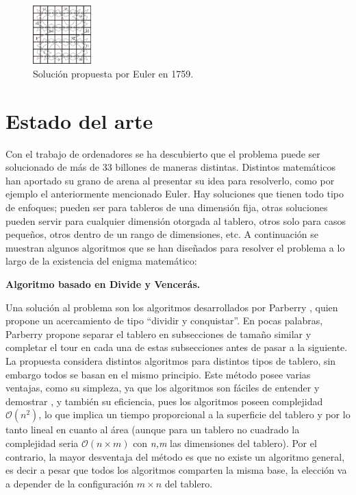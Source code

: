 \documentclass[journal, 10pt]{IEEEtran}
\begin{document}
\begin{figure}[h]

\centering
\includegraphics[width=0.2\textwidth]{figures/EulerKT.png}
\caption{Soluci\'on propuesta por Euler en 1759.}
\label{fig:euler}

\end{figure}


\section{Estado del arte}
Con el trabajo de ordenadores se ha descubierto que el problema puede ser solucionado de más de 33 billones de maneras distintas. Distintos matemáticos han aportado su grano de arena al presentar su idea para resolverlo, como por ejemplo el anteriormente mencionado Euler. Hay soluciones que tienen todo tipo de enfoques; pueden ser para tableros de una dimensión fija, otras soluciones pueden servir para cualquier dimensión otorgada al tablero, otros solo para casos pequeños, otros dentro de un rango de dimensiones, etc. A continuación se muestran algunos algoritmos que se han diseñados para resolver el problema a lo largo de la existencia del enigma matemático:

\textbf{Algoritmo basado en Divide y Vencer\'as.}

Una solución al problema son los algoritmos desarrollados por Parberry \cite{Parberry:1997}, quien propone un acercamiento de tipo “dividir y conquistar”. En pocas palabras, Parberry propone separar el tablero en subsecciones de tamaño similar y completar el tour en cada una de estas subsecciones antes de pasar a la siguiente. La propuesta considera distintos algoritmos para distintos tipos de tablero, sin embargo todos se basan en el mismo principio. Este método posee varias ventajas, como su simpleza, ya que los algoritmos son fáciles de entender y demostrar \cite{Parberry:1997}, y también su eficiencia, pues los algoritmos poseen complejidad $\mathcal{O}(n^2)$, lo que implica un tiempo proporcional a la superficie del tablero y por lo tanto lineal en cuanto al área (aunque para un tablero no cuadrado la complejidad seria $\mathcal{O}(n\times m) $ con \textit{n,m} las dimensiones del tablero). Por el contrario, la mayor desventaja del método es que no existe un algoritmo general, es decir a pesar que todos los algoritmos comparten la misma base, la elección va a depender de la configuración $m\times n$ del tablero.
\end{document}

